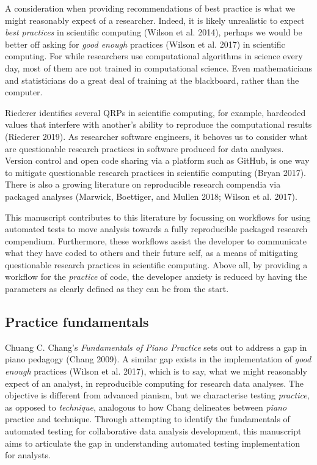 \documentclass[
]{article}
\begin{document}
A consideration when providing recommendations of best practice is what
we might reasonably expect of a researcher. Indeed, it is likely
unrealistic to expect \emph{best practices} in scientific computing
(Wilson et al. 2014), perhaps we would be better off asking for
\emph{good enough} practices (Wilson et al. 2017) in scientific
computing. For while researchers use computational algorithms in science
every day, most of them are not trained in computational science. Even
mathematicians and statisticians do a great deal of training at the
blackboard, rather than the computer.

Riederer identifies several QRPs in scientific computing, for example,
hardcoded values that interfere with another's ability to reproduce the
computational results (Riederer 2019). As researcher software engineers,
it behoves us to consider what are questionable research practices in
software produced for data analyses. Version control and open code
sharing via a platform such as GitHub, is one way to mitigate
questionable research practices in scientific computing (Bryan 2017).
There is also a growing literature on reproducible research compendia
via packaged analyses (Marwick, Boettiger, and Mullen 2018; Wilson et
al. 2017).

This manuscript contributes to this literature by focussing on workflows
for using automated tests to move analysis towards a fully reproducible
packaged research compendium. Furthermore, these workflows assist the
developer to communicate what they have coded to others and their future
self, as a means of mitigating questionable research practices in
scientific computing. Above all, by providing a workflow for the
\emph{practice} of code, the developer anxiety is reduced by having the
parameters as clearly defined as they can be from the start.

\hypertarget{practice-fundamentals}{%
\subsection{Practice fundamentals}\label{practice-fundamentals}}

Chuang C. Chang's \emph{Fundamentals of Piano Practice} sets out to
address a gap in piano pedagogy (Chang 2009). A similar gap exists in
the implementation of \emph{good enough} practices (Wilson et al. 2017),
which is to say, what we might reasonably expect of an analyst, in
reproducible computing for research data analyses. The objective is
different from advanced pianism, but we characterise testing
\emph{practice}, as opposed to \emph{technique}, analogous to how Chang
delineates between \emph{piano} practice and technique. Through
attempting to identify the fundamentals of automated testing for
collaborative data analysis development, this manuscript aims to
articulate the gap in understanding automated testing implementation for
analysts.
\end{document}
